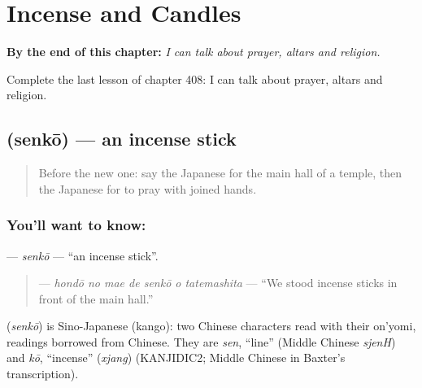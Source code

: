 
\chapter{Incense and Candles}
\label{ch:ja-incense-and-candles}

\begin{chapteropening}
\textbf{By the end of this chapter:} \emph{I can talk about prayer, altars and religion.}

Complete the last lesson of chapter 408: I can talk about prayer, altars and religion.
\end{chapteropening}

\section[\texorpdfstring{\ja{せんこう} (senkō)}{せんこう (senkō)}]{ (senkō) — an incense stick}

\label{lesson:JA-C408-senkou}



\begin{quote}
Before the new one: say the Japanese for the main hall of a temple, then the Japanese for to pray with joined hands.
\end{quote}

\subsection*{You'll want to know: }
\textbf{} — \emph{senkō} — \textquotedblleft{}an incense stick\textquotedblright{}.

\begin{quote}
\textbf{   } — \emph{hondō no mae de senkō o tatemashita} — \textquotedblleft{}We stood incense sticks in front of the main hall.\textquotedblright{}
\end{quote}

\begin{cousinweb}
\textbf{} (\emph{senkō}) is Sino-Japanese (kango): two Chinese characters read with their on'yomi, readings borrowed from Chinese. They are \emph{sen}, \textquotedblleft{}line\textquotedblright{} (Middle Chinese \emph{sjenH}) and \emph{kō}, \textquotedblleft{}incense\textquotedblright{} (\emph{xjang}) (KANJIDIC2; Middle Chinese in Baxter's transcription).
\end{cousinweb}

